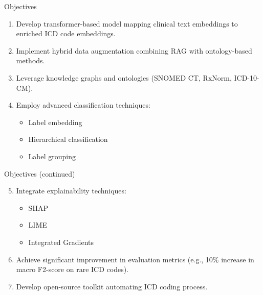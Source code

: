 \documentclass{beamer}
\begin{document}
\begin{frame}{Objectives}
    \begin{enumerate}
        \item Develop transformer-based model mapping clinical text embeddings to enriched ICD code embeddings.
        \item Implement hybrid data augmentation combining RAG with ontology-based methods.
        \item Leverage knowledge graphs and ontologies (SNOMED CT, RxNorm, ICD-10-CM).
        \item Employ advanced classification techniques:
        \begin{itemize}
            \item Label embedding
            \item Hierarchical classification
            \item Label grouping
        \end{itemize}
    \end{enumerate}
\end{frame}

\begin{frame}{Objectives (continued)}
    \begin{enumerate}
        \setcounter{enumi}{4}
        \item Integrate explainability techniques:
        \begin{itemize}
            \item SHAP
            \item LIME
            \item Integrated Gradients
        \end{itemize}
        \item Achieve significant improvement in evaluation metrics (e.g., 10\% increase in macro F2-score on rare ICD codes).
        \item Develop open-source toolkit automating ICD coding process.
    \end{enumerate}
\end{frame}
\end{document}
